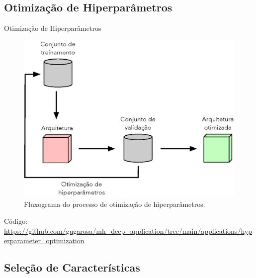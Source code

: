 \subsection{Otimização de Hiperparâmetros}
\label{ss.applications_hyperparameter}

\begin{frame}{Otimização de Hiperparâmetros}
	\begin{figure}
		\centering
		\includegraphics[scale=0.45]{figs/hyperparameter_opt.eps}	
		\caption{Fluxograma do processo de otimização de hiperparâmetros.}
		\label{f.hyperparameter_opt}
	\end{figure}
	Código: \url{https://github.com/gugarosa/mh_deep_application/tree/main/applications/hyperparameter_optimization}
\end{frame}

\subsection{Seleção de Características}
\label{ss.applications_feature_selection}

